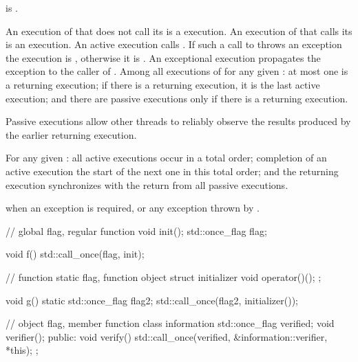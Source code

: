 \begin{itemdescr}
\pnum
\mandates
{} is .

\pnum
\effects
An execution of  that does not call its  is a
 execution. An execution of  that calls its 
is an  execution. An active execution calls
. If such a call to 
throws an exception the execution is , otherwise it is .
An exceptional execution propagates the exception to the caller of
. Among all executions of  for any given
: at most one is a returning execution; if there is a
returning execution, it is the last active execution; and there are
passive executions only if there is a returning execution.
\begin{note}
Passive
executions allow other threads to reliably observe the results produced by the
earlier returning execution.
\end{note}

\pnum
\sync
For any given : all active executions occur in a total
order; completion of an active execution 
the start of the next one in this total order; and the returning execution
synchronizes with the return from all passive executions.

\pnum
\throws
{} when
an exception is required, or any exception thrown by .

\pnum
\begin{example}
\begin{codeblock}
// global flag, regular function
void init();
std::once_flag flag;

void f() {
  std::call_once(flag, init);
}

// function static flag, function object
struct initializer {
  void operator()();
};

void g() {
  static std::once_flag flag2;
  std::call_once(flag2, initializer());
}

// object flag, member function
class information {
  std::once_flag verified;
  void verifier();
public:
  void verify() { std::call_once(verified, &information::verifier, *this); }
};
\end{codeblock}
\end{example}
\end{itemdescr}


